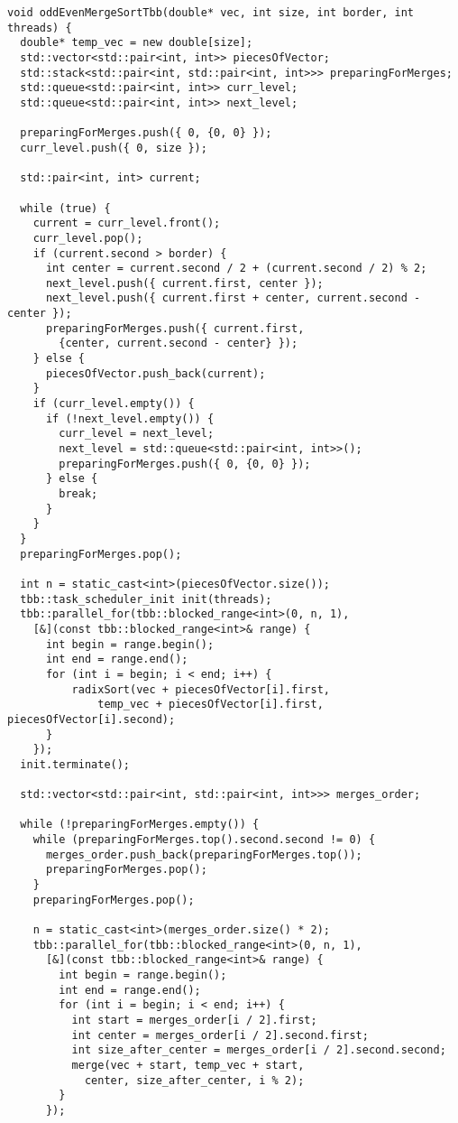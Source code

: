 \documentclass{report}
\begin{document}
\begin{lstlisting}
void oddEvenMergeSortTbb(double* vec, int size, int border, int threads) {
  double* temp_vec = new double[size];
  std::vector<std::pair<int, int>> piecesOfVector;
  std::stack<std::pair<int, std::pair<int, int>>> preparingForMerges;
  std::queue<std::pair<int, int>> curr_level;
  std::queue<std::pair<int, int>> next_level;

  preparingForMerges.push({ 0, {0, 0} });
  curr_level.push({ 0, size });

  std::pair<int, int> current;

  while (true) {
    current = curr_level.front();
    curr_level.pop();
    if (current.second > border) {
      int center = current.second / 2 + (current.second / 2) % 2;
      next_level.push({ current.first, center });
      next_level.push({ current.first + center, current.second - center });
      preparingForMerges.push({ current.first,
        {center, current.second - center} });
    } else {
      piecesOfVector.push_back(current);
    }
    if (curr_level.empty()) {
      if (!next_level.empty()) {
        curr_level = next_level;
        next_level = std::queue<std::pair<int, int>>();
        preparingForMerges.push({ 0, {0, 0} });
      } else {
        break;
      }
    }
  }
  preparingForMerges.pop();

  int n = static_cast<int>(piecesOfVector.size());
  tbb::task_scheduler_init init(threads);
  tbb::parallel_for(tbb::blocked_range<int>(0, n, 1),
    [&](const tbb::blocked_range<int>& range) {
      int begin = range.begin();
      int end = range.end();
      for (int i = begin; i < end; i++) {
          radixSort(vec + piecesOfVector[i].first,
              temp_vec + piecesOfVector[i].first, piecesOfVector[i].second);
      }
    });
  init.terminate();

  std::vector<std::pair<int, std::pair<int, int>>> merges_order;

  while (!preparingForMerges.empty()) {
    while (preparingForMerges.top().second.second != 0) {
      merges_order.push_back(preparingForMerges.top());
      preparingForMerges.pop();
    }
    preparingForMerges.pop();

    n = static_cast<int>(merges_order.size() * 2);
    tbb::parallel_for(tbb::blocked_range<int>(0, n, 1),
      [&](const tbb::blocked_range<int>& range) {
        int begin = range.begin();
        int end = range.end();
        for (int i = begin; i < end; i++) {
          int start = merges_order[i / 2].first;
          int center = merges_order[i / 2].second.first;
          int size_after_center = merges_order[i / 2].second.second;
          merge(vec + start, temp_vec + start,
            center, size_after_center, i % 2);
        }
      });


\end{lstlisting}
\end{document}
